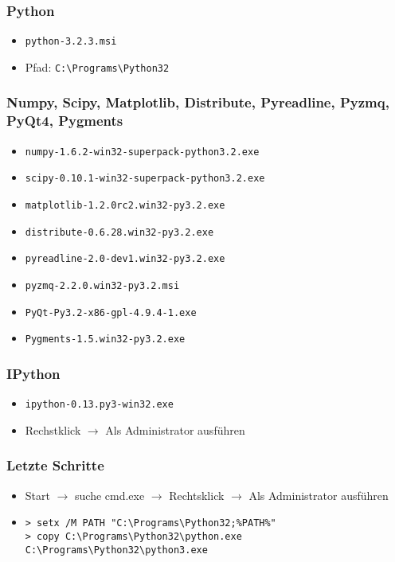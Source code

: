 \subsubsection{Python}
\begin{itemize}
  \item \texttt{python-3.2.3.msi}
  \item Pfad: \verb|C:\Programs\Python32|
\end{itemize}

\subsubsection{Numpy, Scipy, Matplotlib, Distribute, Pyreadline, Pyzmq, PyQt4, Pygments}
\begin{itemize}
  \item \texttt{numpy-1.6.2-win32-superpack-python3.2.exe}
  \item \texttt{scipy-0.10.1-win32-superpack-python3.2.exe}
  \item \texttt{matplotlib-1.2.0rc2.win32-py3.2.exe}
  \item \texttt{distribute-0.6.28.win32-py3.2.exe}
  \item \texttt{pyreadline-2.0-dev1.win32-py3.2.exe}
  \item \texttt{pyzmq-2.2.0.win32-py3.2.msi}
  \item \texttt{PyQt-Py3.2-x86-gpl-4.9.4-1.exe}
  \item \texttt{Pygments-1.5.win32-py3.2.exe}
\end{itemize}

\subsubsection{IPython}
\begin{itemize}
  \item \texttt{ipython-0.13.py3-win32.exe}
  \item Rechstklick $\rightarrow$ Als Administrator ausführen
\end{itemize}

\subsubsection{Letzte Schritte}
\begin{itemize}
  \item Start $\rightarrow$ suche cmd.exe $\rightarrow$ Rechtsklick $\rightarrow$ Als Administrator ausführen
  \item
\begin{verbatim}
> setx /M PATH "C:\Programs\Python32;%PATH%"
> copy C:\Programs\Python32\python.exe C:\Programs\Python32\python3.exe
\end{verbatim}
\end{itemize}

